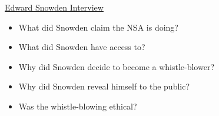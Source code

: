 \documentclass{beamer}
\begin{document}
\begin{frame}{\href{http://www.youtube.com/watch?v=kaRvzQ887HM}{Edward Snowden Interview}}
\begin{itemize}
\item What did Snowden claim the NSA is doing?
\bigskip
\item What did Snowden have access to?
\bigskip
\item Why did Snowden decide to become a whistle-blower?
\bigskip
\item Why did Snowden reveal himself to the public?
\bigskip
\item Was the whistle-blowing ethical?
\end{itemize}
\end{frame}
\end{document}
